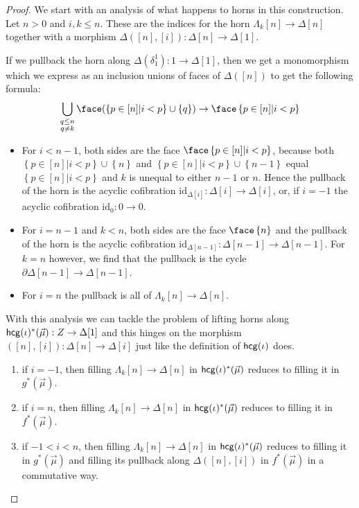 \documentclass{amsart}
\theoremstyle{plain}
\theoremstyle{definition}
\newcommand\set[1]{\left\{#1\right\}}
\newcommand\id{\mathrm{id}}
\newcommand\ri{^*}
\begin{document}
\begin{proof} We start with an analysis of what happens to horns in this construction.
Let $n>0$ and $i,k\leq n$. These are the indices for the horn $\Lambda_k[n] \to \Delta[n]$ together with a morphism $\Delta([n],[i]):\Delta[n]\to\Delta[1]$. 

If we pullback the horn along $\Delta(\delta^1_1):1\to \Delta[1]$, then we get a monomorphism which we express as an inclusion unions of faces of $\Delta([n])$ to get the following formula:
\begin{equation}
\bigcup_{\substack{q\leq n\\q\neq k}} \face(\set{p\in [n] | i < p}\cup\set{q}) \to \face\set{p\in [n] | i < p}
\end{equation}
\begin{itemize}
\item For $i<n-1$, both sides are the face $\face\set{p\in [n] | i < p}$, because both $\set{p\in [n] | i < p}\cup\set{n}$ and $\set{p\in [n] | i < p}\cup\set{n-1}$ equal $\set{p\in [n] | i < p}$ and $k$ is unequal to either $n-1$ or $n$. Hence the pullback of the horn is the acyclic cofibration $\id_{\Delta[i]}: \Delta[i]\to\Delta[i]$, or, if $i=-1$ the acyclic cofibration $\id_0:0\to 0$.
\item For $i=n-1$ and $k<n$, both sides are the face $\face\set{n}$ and the pullback of the horn is the acyclic cofibration $\id_{\Delta[n-1]}: \Delta[n-1]\to\Delta[n-1]$. For $k=n$ however, we find that the pullback is the cycle $\partial \Delta[n-1] \to \Delta[n-1]$.
\item For $i=n$ the pullback is all of $\Lambda_k[n] \to \Delta[n]$.
\end{itemize}

With this analysis we can tackle the problem of lifting horns along $\hcg(\iota)\ri(\vec\mu):Z\to \Delta[1]$ and this hinges on the morphism $([n],[i]):\Delta[n] \to \Delta[i]$ just like the definition of $\mathsf{hcg}(\iota)$ does.

\begin{enumerate}
\item if $i=-1$, then filling $\Lambda_k[n] \to \Delta[n]$ in $\hcg(\iota)\ri(\vec\mu)$ reduces to filling it in $g\ri(\vec\mu)$.
\item if $i=n$, then filling $\Lambda_k[n] \to \Delta[n]$ in $\hcg(\iota)\ri(\vec\mu)$ reduces to filling it in $f\ri(\vec\mu)$.
\item if $-1<i<n$, then filling $\Lambda_k[n] \to \Delta[n]$ in $\hcg(\iota)\ri(\vec\mu)$ reduces to filling it in $g\ri(\vec\mu)$ and filling its pullback along $\Delta([n],[i])$ in $f\ri(\vec\mu)$ in a commutative way.
\end{enumerate}


\end{proof}
\end{document}
